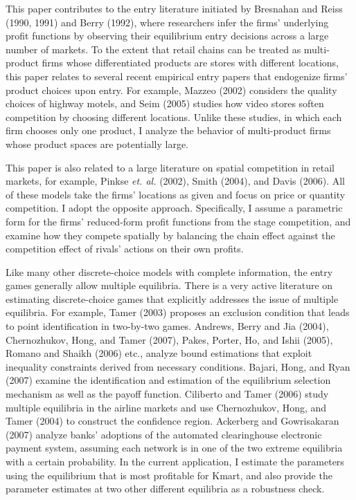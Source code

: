 \documentclass[notitlepage,onecolumn,11pt]{article}
\begin{document}
This paper contributes to the entry literature initiated by Bresnahan and
Reiss (1990, 1991) and Berry (1992), where researchers infer the firms'
underlying profit functions by observing their equilibrium entry decisions
across a large number of markets. To the extent that retail chains can be
treated as multi-product firms whose differentiated products are stores with
different locations, this paper relates to several recent empirical entry
papers that endogenize firms' product choices upon entry. For example,
Mazzeo (2002) considers the quality choices of highway motels, and Seim
(2005) studies how video stores soften competition by choosing different
locations. Unlike these studies, in which each firm chooses only one
product, I analyze the behavior of multi-product firms whose product spaces
are potentially large.

This paper is also related to a large literature on spatial competition in
retail markets, for example, Pinkse \textit{et. al. }(2002), Smith (2004),
and Davis (2006). All of these models take the firms' locations as given and
focus on price or quantity competition. I adopt the opposite approach.
Specifically, I assume a parametric form for the firms' reduced-form profit
functions from the stage competition, and examine how they compete spatially
by balancing the chain effect against the competition effect of rivals'
actions on their own profits.

Like many other discrete-choice models with complete information, the entry
games generally allow multiple equilibria. There is a very active literature
on estimating discrete-choice games that explicitly addresses the issue of
multiple equilibria. For example, Tamer (2003) proposes an exclusion
condition that leads to point identification in two-by-two games. Andrews,
Berry and Jia (2004), Chernozhukov, Hong, and Tamer (2007), Pakes, Porter,
Ho, and Ishii (2005), Romano and Shaikh (2006) etc., analyze bound
estimations that exploit inequality constraints derived from necessary
conditions. Bajari, Hong, and Ryan (2007) examine the identification and
estimation of the equilibrium selection mechanism as well as the payoff
function. Ciliberto and Tamer (2006) study multiple equilibria in the
airline markets and use Chernozhukov, Hong, and Tamer (2004) to construct
the confidence region. Ackerberg and Gowrisakaran (2007) analyze banks'
adoptions of the automated clearinghouse electronic payment system, assuming
each network is in one of the two extreme equilibria with a certain
probability. In the current application, I estimate the parameters using the
equilibrium that is most profitable for Kmart, and also provide the
parameter estimates at two other different equilibria as a robustness check.
\end{document}
